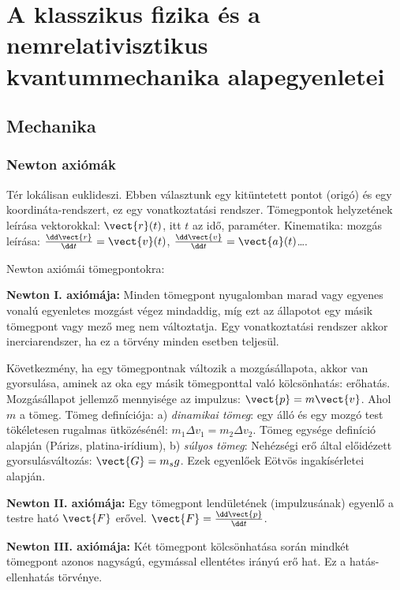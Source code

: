 \chapter{A klasszikus fizika \'es a nemrelativisztikus kvantummechanika alapegyenletei}\label{1tetel}
 
 \section{Mechanika}
  
  \subsection{Newton axiómák}
   
   Tér lokálisan euklideszi.
   Ebben választunk egy kitüntetett pontot (origó) és egy koordináta-rendszert, ez egy vonatkoztatási rendszer.
   Tömegpontok  helyzetének leírása vektorokkal: $\vect{r}(t)$, itt $t$ az idő, paraméter.
   Kinematika: mozgás leírása: $\frac{\dd\vect{r}}{\dd t}= \vect{v}(t)$, $\frac{\dd\vect{v}}{\dd t}= \vect{a}(t)$\dots. 
   
   Newton axiómái tömegpontokra:
   
   {\bf Newton I. axiómája:} Minden tömegpont nyugalomban marad vagy egyenes vonalú egyenletes mozgást végez mindaddig, míg ezt az állapotot egy másik tömegpont vagy mező meg nem változtatja.
   Egy vonatkoztatási rendszer akkor inerciarendszer, ha ez a törvény minden esetben teljesül.
   
   Következmény, ha egy tömegpontnak változik a mozgásállapota, akkor van gyorsulása, aminek az oka egy másik tömegponttal való kölcsönhatás: erőhatás.
   Mozgásállapot jellemző mennyisége az impulzus: $\vect{p}=m\vect{v}$.
   Ahol $m$ a tömeg.
   Tömeg definíciója: a) {\it dinamikai tömeg}: egy álló és egy mozgó test tökéletesen rugalmas ütközésénél: $m_1 \Delta v_1=m_2 \Delta v_2$.
   Tömeg egysége definíció alapján (Párizs, platina-irídium), b) {\it súlyos tömeg}: Nehézségi erő által előidézett gyorsulásváltozás: $\vect{G}=m_s g$.
   Ezek egyenlőek Eötvös ingakísérletei alapján.
   
   {\bf Newton II. axiómája:} Egy tömegpont lendületének (impulzusának) egyenlő a testre ható $\vect{F}$ erővel. $\vect{F}=\frac{\dd \vect{p}}{\dd t}$. 
   
   {\bf Newton III. axiómája:} Két tömegpont kölcsönhatása során mindkét tömegpont azonos nagyságú, egymással ellentétes irányú erő hat.
   Ez a hatás-ellenhatás törvénye. 
   
